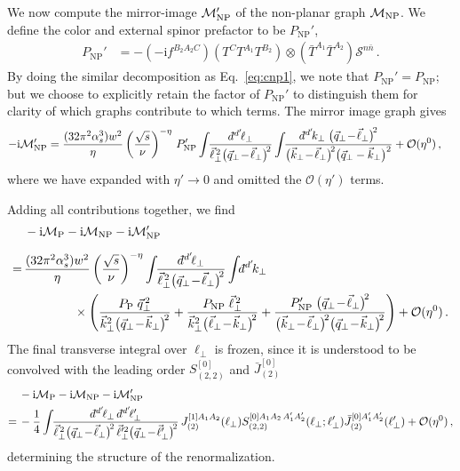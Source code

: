 \documentclass[letterpaper,11pt]{article}
\def\cS{\mathcal{S}}
\newcommand{\eq}[1]{Eq.~\eqref{eq:#1}}
\newcommand{\img}{\mathrm{i}}
\newcommand{\cM}{\mathcal{M}}
\newcommand{\cO}{\mathcal{O}}
\newcommand{\as}{\alpha_s}
\newcommand{\nn}{\nonumber}
\newcommand\prp[1]{\vec #1_\perp}
\newcommand\prpsq[1]{\vec{#1}^{2}_\perp}
\newcommand\prpsqm[2]{\bigl( \prp{#1} \!-\! \prp{#2} \bigr)^{\!2}}
\newcommand\prnth[1]{\left(#1\right)}
\newcommand{\bn}{{\bar n}}
\newcommand{\bT}{{\bar T}}
\newcommand{\dbar}{d\hspace*{-0.08em}\bar{}\hspace*{0.1em}}
\begin{document}
We now compute the mirror-image $\cM_{\rm{NP}}'$ of the non-planar graph $\cM_{\rm{NP}}$. We define the color and external spinor prefactor to be $P_{\text{NP}}'$,
\begin{align}
  P_\text{NP}' &= -\prnth{-\img f^{B_2 A_2 C}}\prnth{T^{C} T^{A_1} T^{B_2}} \otimes \prnth{\bT^{A_1} \bT^{A_2 }} \cS^{n\bn} \,.
\end{align}
By doing the similar decomposition as \eq{cnp1}, we note that $P_{\text{NP}}' = P_{\text{NP}}$; but we choose to explicitly retain the factor of $P_{\text{NP}}'$ to distinguish them for clarity of which graphs contribute to which terms. The mirror image graph gives
\begin{align}
 -\img\cM_{\rm{NP}}'
&=\frac{(32 \pi^2 \as^3) w^2}{\eta} \left(\frac{\sqrt{s}}{\nu} \right)^{-\eta} \,  P'_\text{NP}
 \int\!\! \frac{\dbar^{d'}\!\ell_\perp}{\vec\ell_\perp^{\,2} \prpsqm{q}{\ell}}
 \int\!\! \frac{\dbar^{d'}\!k_\perp \; \prpsqm{q}{\ell}}{
 \prpsqm{k}{\ell} \bigl(\prp{q} - \prp{k}  \bigr)^2
} + \cO(\eta^0)
\,,
\end{align}
where we have expanded with $\eta'\to0$ and omitted the $\cO(\eta')$ terms.


Adding all contributions together, we find
\begin{align}
&-\img\cM_{\rm{P}}-\img\cM_{\rm{NP}}-\img\cM_{\rm{NP}}'\nn\\[.2cm]
=\,& \frac{(32 \pi^2 \as^3) w^2}{\eta} \left(\frac{\sqrt{s}}{\nu} \right)^{-\eta} 
 \int\!\! \frac{\dbar^{d'}\!\ell_\perp}{\vec\ell_\perp^{\,2} \prpsqm{q}{\ell}}
 \int\!\!\dbar^{d'}\!k_\perp \nn\\
 &\qquad\qquad\times
 \left(\frac{P_\text{P}\; \vec q_\perp^{\,2}}{\prpsq{k} \prpsqm{q}{k}}
 + \frac{P_\text{NP} \; \vec\ell_\perp^{\,2}}{\prpsq{k} \prpsqm{\ell}{k}}
 + \frac{P_\text{NP}' \; \prpsqm{q}{\ell}}{\prpsqm{k}{\ell} \prpsqm{q}{k} }\right)+\cO(\eta^0)
 \,.
\end{align}
The final transverse integral over $\ell_\perp$ is frozen, since it is understood to be convolved with the leading order $S_{(2,2)}^{[0]}$ and $\bar J_{(2)}^{[0]}$
\begin{align}
  & -\img\cM_{\rm{P}}-\img\cM_{\rm{NP}}-\img\cM_{\rm{NP}}'\\ 
  =\,& -\frac14 \int\!\! \frac{\dbar^{d'}\!\ell_\perp\, \dbar^{d'}\!\ell'_{\perp} }{\vec\ell_\perp^{\,2} \prpsqm{q}{\ell}\, \vec\ell^{\prime2}_\perp \prpsqm{q}{\ell'}} \,
J_{(2)}^{[1]A_1 A_2}(\ell_\perp)  S_{(2,2)}^{[0]A_1 A_2\, A_1' A_2'}(\ell_{\perp}; \ell^{\prime}_{\perp} ) \bar J_{(2)}^{[0] A_1' A_2'}(\ell_\perp^{\prime}) +\cO(\eta^0)\,, \nn
\end{align}
determining the structure of the renormalization.
\end{document}
